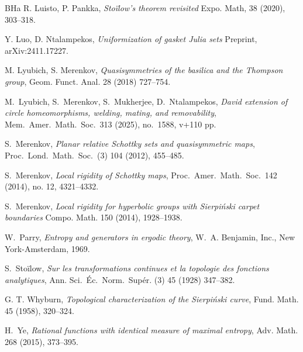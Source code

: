 \documentclass[12pt]{amsart}
\begin{document}
\begin{thebibliography}{BHa}
 R. Luisto, P.  Pankka, \emph{Sto\"ilow’s theorem revisited} Expo. Math, 38 (2020), 303--318.

 Y. Luo, D. Ntalampekos, \emph{Uniformization of gasket Julia sets} Preprint, arXiv:2411.17227.

 M. Lyubich, S. Merenkov, \emph{Quasisymmetries of the basilica and the Thompson group}, Geom. Funct. Anal. 28 (2018) 727--754.

 M.~Lyubich, S.~Merenkov, S.~Mukherjee, D.~Ntalampekos, \emph{David extension of circle homeomorphisms, welding, mating, and removability}, Mem.\ Amer.\ Math.\ Soc.\ 313 (2025), no.\ 1588, v+110 pp.
   


 S.~Merenkov, \emph{Planar relative Schottky sets and quasisymmetric maps},
Proc.\ Lond.\ Math.\ Soc.\ (3) 104 (2012), 455--485.


 S.~Merenkov,  \emph{Local rigidity of Schottky maps}, Proc.\ Amer.\ Math.\ Soc.\ 142 (2014), no. 12, 4321--4332.


 S.~Merenkov,  \emph{Local rigidity for hyperbolic groups with Sierpi\'nski carpet boundaries} Compo. Math. 150 (2014), 1928--1938.


 
 W.~Parry, \emph{Entropy and generators in ergodic theory}, W.\ A. Benjamin, Inc., New
York-Amsterdam, 1969. 
 
 S.~Sto\"ilow, \emph{Sur les transformations continues et la topologie des fonctions analytiques}, Ann. Sci.\ \'Ec.\ Norm.\ Sup\'er. (3) 45 (1928) 347--382.


 G. T. Whyburn, \emph{Topological characterization of the Sierpi\'nski curve}, Fund. Math. 45 (1958), 320--324.




 H.~Ye, \emph{Rational functions with identical measure of maximal entropy},
Adv. Math. 268 (2015), 373--395.


\end{thebibliography}
\end{document}
